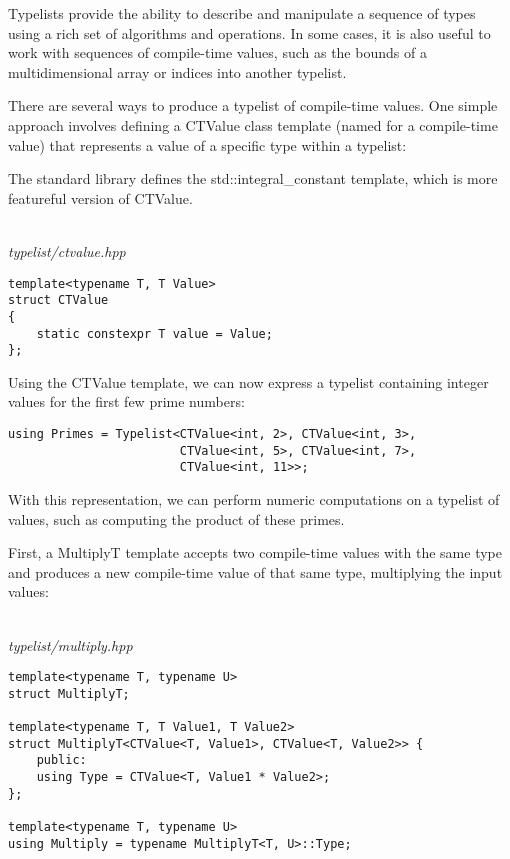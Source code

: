 
Typelists provide the ability to describe and manipulate a sequence of types using a rich set of algorithms and operations. In some cases, it is also useful to work with sequences of compile-time values, such as the bounds of a multidimensional array or indices into another typelist.

There are several ways to produce a typelist of compile-time values. One simple approach involves defining a CTValue class template (named for a compile-time value) that represents a value of a specific type within a typelist:

\begin{tcolorbox}[colback=webgreen!5!white,colframe=webgreen!75!black]
\hspace*{0.75cm}The standard library defines the std::integral\_constant template, which is more featureful version of CTValue.
\end{tcolorbox}

\hspace*{\fill} \\ %
\noindent
\textit{typelist/ctvalue.hpp}
\begin{lstlisting}[style=styleCXX]
template<typename T, T Value>
struct CTValue
{
	static constexpr T value = Value;
};
\end{lstlisting}

Using the CTValue template, we can now express a typelist containing integer values for the first few prime numbers:

\begin{lstlisting}[style=styleCXX]
using Primes = Typelist<CTValue<int, 2>, CTValue<int, 3>,
						CTValue<int, 5>, CTValue<int, 7>,
						CTValue<int, 11>>;
\end{lstlisting}

With this representation, we can perform numeric computations on a typelist of values, such as computing the product of these primes.

First, a MultiplyT template accepts two compile-time values with the same type and produces a new compile-time value of that same type, multiplying the input values:

\hspace*{\fill} \\ %
\noindent
\textit{typelist/multiply.hpp}
\begin{lstlisting}[style=styleCXX]
template<typename T, typename U>
struct MultiplyT;

template<typename T, T Value1, T Value2>
struct MultiplyT<CTValue<T, Value1>, CTValue<T, Value2>> {
	public:
	using Type = CTValue<T, Value1 * Value2>;
};

template<typename T, typename U>
using Multiply = typename MultiplyT<T, U>::Type;
\end{lstlisting}

